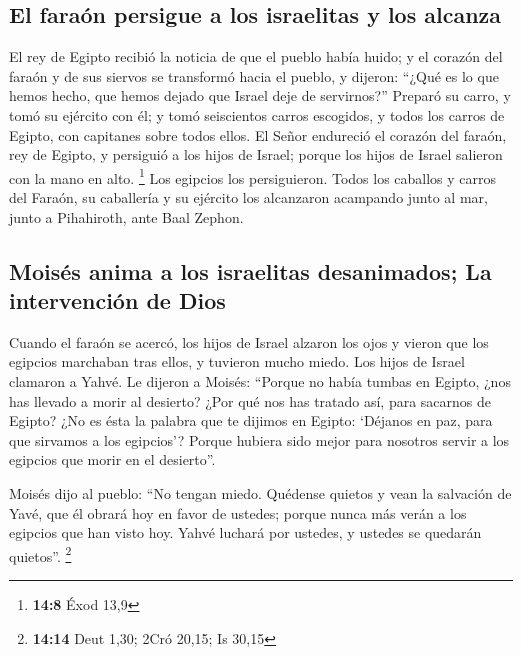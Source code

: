 \hypertarget{el-farauxf3n-persigue-a-los-israelitas-y-los-alcanza}{%
\subsection{El faraón persigue a los israelitas y los
alcanza}\label{el-farauxf3n-persigue-a-los-israelitas-y-los-alcanza}}

 El rey de Egipto recibió la noticia de que el pueblo
había huido; y el corazón del faraón y de sus siervos se transformó
hacia el pueblo, y dijeron: ``¿Qué es lo que hemos hecho, que hemos
dejado que Israel deje de servirnos?''  Preparó su carro,
y tomó su ejército con él;  y tomó seiscientos carros
escogidos, y todos los carros de Egipto, con capitanes sobre todos
ellos.  El Señor endureció el corazón del faraón, rey de
Egipto, y persiguió a los hijos de Israel; porque los hijos de Israel
salieron con la mano en alto. \footnote{\textbf{14:8} Éxod 13,9}
 Los egipcios los persiguieron. Todos los caballos y
carros del Faraón, su caballería y su ejército los alcanzaron acampando
junto al mar, junto a Pihahiroth, ante Baal Zephon.

\hypertarget{moisuxe9s-anima-a-los-israelitas-desanimados-la-intervenciuxf3n-de-dios}{%
\subsection{Moisés anima a los israelitas desanimados; La intervención
de
Dios}\label{moisuxe9s-anima-a-los-israelitas-desanimados-la-intervenciuxf3n-de-dios}}

 Cuando el faraón se acercó, los hijos de Israel alzaron
los ojos y vieron que los egipcios marchaban tras ellos, y tuvieron
mucho miedo. Los hijos de Israel clamaron a Yahvé.  Le
dijeron a Moisés: ``Porque no había tumbas en Egipto, ¿nos has llevado a
morir al desierto? ¿Por qué nos has tratado así, para sacarnos de
Egipto?  ¿No es ésta la palabra que te dijimos en Egipto:
`Déjanos en paz, para que sirvamos a los egipcios'? Porque hubiera sido
mejor para nosotros servir a los egipcios que morir en el desierto''.

 Moisés dijo al pueblo: ``No tengan miedo. Quédense
quietos y vean la salvación de Yavé, que él obrará hoy en favor de
ustedes; porque nunca más verán a los egipcios que han visto hoy.
 Yahvé luchará por ustedes, y ustedes se quedarán
quietos''. \footnote{\textbf{14:14} Deut 1,30; 2Cró 20,15; Is 30,15}

